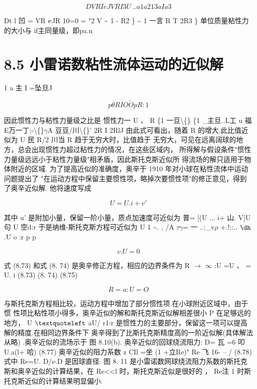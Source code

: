 \[D VR I eJ VR I 3 U~.. a  1 a2    1 3 a I a3  \]

Dt l 凹 = VR ${\rm e}$JR 10=0 = "2 V \textasciitilde{} 1 - R2 \} \textasciitilde{} 1 一言 R T 2R3 \} 单位质量粘性力的大小与 if主同量级，即pa.n

\section*{8.5  小雷诺数粘性流体运动的近似解}

1 a 主 I =坠旦J

\[p\theta R I O\tilde{O} pR:1\]

因此惯性力与粘性力量级之比是 惯性力一 U 、 R \{1 一豆\textbackslash\{\} \{1 \_主旦..L工 u 福E万一丁;-\textbackslash\{\}$\gamma$A 豆豆/川\textbackslash\{\}' 2R I 2RlJ 由此式可看出，随着 R 的增大.此比值近似为 U 民 R/2 川当 R 趋于无穷大时，比值趋于 无穷大，可见在远离阔球的地方，总会出现惯性力超过粘性力的情况，在这些区域内， 所得解与假设条件"惯性力量级远远小于粘性力量级"相矛盾，因此斯托克斯近似所 得流场的解只适用于物体附近的区域. 为了提高近似的准确度，奥辛于 1910 年对小球在粘性流体中运动问题提出了 "在运动方程中保留主要惯性项，略掉次要惯性项"的修正意见，得到了奥辛近似解. 他将速度写成

\[U = U .i+ v'\]

其中 u' 是附加小量，保留一阶小量，质点加速度可近似为 普= [(U ... i+ 山. V]U 句 U 空d:r 于是纳维-斯托克斯方程可近似为  U 1 \textasciitilde{}. , /A $\tau$$\gamma$= 一 ..:\_v$\rho$ +.!::.. ${\rm ð}$.U o :r p p

\[v. U = 0\]

式 (8.73) 和式 (8. 74) 是奥辛修正方程，相应的边界条件为 R $\rightarrow$ $\infty$ :U =U 、 = U. i (8.73) (8. 74) (8.75)

\begin{equation*}R=a:U=O\tag{8.76}\end{equation*}

与斯托克斯方程相比较，运动方程中增加了部分惯性项.在小球附近区域中，由于惯 性项比粘性项小得多，奥辛近似的解和斯托克斯近似解相差很小 P 在足够远的地方， U ${\rm ‘}$ aU/ r1:r 是惯性力的主要部分，保留这一项可以提高解的精度.在相同边界条件下 奥辛得到了比斯托克斯精度高的一阶近似解(具体解法从略) .奥辛近似的流场示于 图 8.10(b). 奥辛近似的回球绕流阻力: D= 瓦 =6 叩U.a(l+ 哈) (8.77) 奥辛近似的阻力系数 z CIl =坐 (1 +立Re)" Re 飞 16- -- / (8.78) 式中 Re=U. D/$\nu$.D 是因球直径. 图 8. 11 是小雷诺数网球绕流阻力系数的斯托克斯和奥辛近似的计算结果，在 Re<<l 时，斯托克斯近似是很好的 ， Re注 1 时斯托克斯近似的计算结果明显偏小.

